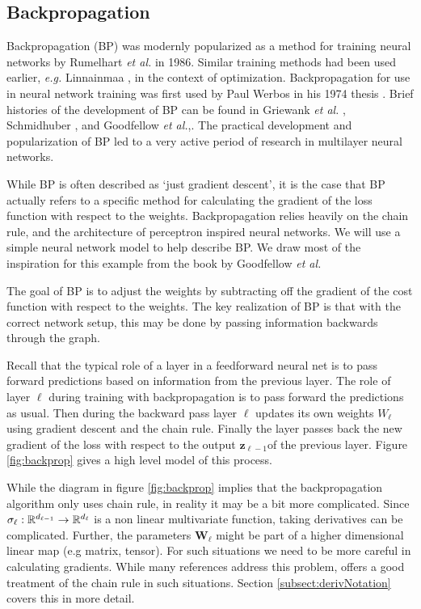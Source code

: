\subsection{Backpropagation}\label{subsect:backprop}
Backpropagation (BP) was modernly popularized as a method for training neural networks by Rumelhart \textit{et al.} \cite{rumelhart1986learning} in 1986. Similar training methods had been used earlier, \textit{e.g.} Linnainmaa \cite{Linnainmaa1976}, in the context of optimization. Backpropagation for use in neural network training was first used by Paul Werbos in his 1974 thesis \cite{werbos1994roots}. Brief histories of the development of BP can be found in Griewank \textit{et al.} \cite{griewank2008deriv}, Schmidhuber \cite{Schmidhuber_2015}, and Goodfellow \textit{et al.},\cite[see ch6.6]{Goodfellow-et-al-2016}. The practical development and popularization of BP led to a very active period of research in multilayer neural networks.

While BP is often described as `just gradient descent', it is the case that BP actually refers to a specific method for calculating the gradient of the loss function with respect to the weights.  Backpropagation relies heavily on the chain rule, and the architecture of perceptron inspired neural networks. We will use a simple neural network model to help describe BP.  We draw most of the inspiration for this example from the book by Goodfellow  \textit{et al.} \cite[ch6.5]{Goodfellow-et-al-2016}

The goal of BP is to adjust the weights by subtracting off the gradient of the cost function with respect to the weights.  The key realization of BP is that with the correct network setup, this may be done by passing information backwards through the graph.  

Recall that the typical role of a layer in a feedforward neural net is to pass forward predictions based on information from the previous layer.  The role of layer \( \ell \) during training with backpropagation is to pass forward the predictions as usual. Then during the backward pass layer \( \ell \) updates its own weights \( W_{\ell} \) using gradient descent and the chain rule. Finally the layer passes back the new gradient of the loss with respect to the output \( \bm z_{\ell-1} \)of the previous layer.  Figure \ref{fig:backprop} gives a high level model of this process.



While the diagram in figure \ref{fig:backprop} implies that the backpropagation algorithm only uses chain rule, in reality it may be a bit more complicated.  Since \( \sigma_{\ell}:\mathbb R^{d_{\ell-1}}\rightarrow \mathbb R^{d_{\ell}}\) is a non linear multivariate function, taking derivatives can be complicated.  Further, the parameters \( \bm W_{\ell} \) might be part of a higher dimensional linear map (e.g matrix, tensor). For such situations we need to be more careful in calculating gradients.  While many references address this problem, \cite{matGradChain} offers a good treatment of the chain rule in such situations. Section \ref{subsect:derivNotation} covers this in more detail.

